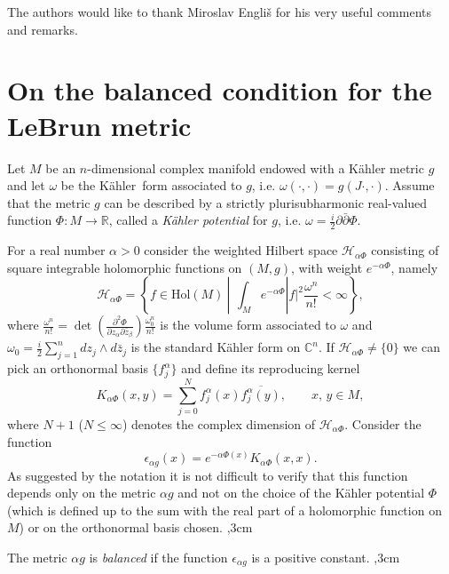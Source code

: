 \documentclass[11pt, reqno]{amsart}
\begin{document}
\vskip 0.3cm

\noindent
The authors would like to thank Miroslav Engli\v{s}
for his very useful comments and remarks.

\section{On the balanced condition for the LeBrun metric}
Let $M$ be an $n$-dimensional complex manifold  endowed with a K\"ahler metric $g$
and let $\omega$ be the {K\"{a}hler}\ form associated to $g$, i.e. $\omega (\cdot ,\cdot  )=g(J\cdot, \cdot)$.
Assume that  the metric $g$ can be described by a
strictly plurisubharmonic real-valued function $\Phi :M\rightarrow{\mathbb{R}}$, called a {\em K\"ahler potential} for $g$,
i.e.
$\omega=\frac{i}{2}{\partial}\bar{\partial} \Phi$.

For a real number $\alpha >0$ consider   the weighted Hilbert space ${\mathcal{H}}_{\alpha \Phi}$ consisting of square integrable holomorphic functions on $(M, g)$, with weight $e^{-\alpha\Phi}$, namely
\begin{equation}\label{hilbertspace}
{\mathcal{H}}_{\alpha\Phi}=\left\{ f\in{\mathrm{Hol}}(M) \ | \ \, \int_M e^{-\alpha\Phi}|f|^2\frac{\omega^n}{n!}<\infty\right\},
\end{equation}
where $\frac{\omega^n}{n!}=\det(\frac{{\partial}^2\Phi}{{\partial} z_\alpha {\partial} \bar z_\beta})\frac{\omega_0^n}{n!}$ is the volume form associated to $\omega$ and $\omega_0=\frac{i}{2}\sum_{j=1}^{n} dz_j\wedge d\bar z_j$ is the standard K\"ahler form on ${\mathbb{C}}^n$.
If ${\mathcal{H}}_{\alpha \Phi}\neq \{0\}$ we can pick an orthonormal basis $\{f_j^{\alpha}\}$ and define its reproducing kernel
$$K_{\alpha \Phi}(x, y)=\sum_{j=0}^N f_j^{\alpha}(x)\overline{f_j^{\alpha}(y)},\qquad x,\, y\in M,$$
where $N+1$ ($N\leq\infty$) denotes the complex dimension of ${\mathcal{H}}_{\alpha \Phi}$.
Consider the function
\begin{equation}\label{epsilon}
\epsilon_{\alpha g}(x)=e^{-\alpha\Phi(x)}K_{\alpha \Phi}(x, x).
\end{equation}
As suggested by the notation it is not difficult to verify  that  this function  depends only on the metric $\alpha g$ and not on the choice of the K\"ahler potential $\Phi$
(which is defined up to the sum with the real part of a holomorphic function on $M$)
or on  the orthonormal basis chosen.
,3cm

 The metric $\alpha g$ is \emph{balanced} if  the function $\epsilon_{\alpha g}$ is a positive  constant.
,3cm
\end{document}
